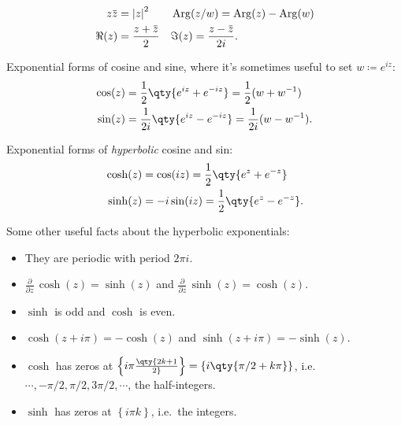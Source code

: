 \begin{fact}

\begin{align*}
z\mkern 1.5mu\overline{\mkern-1.5muz\mkern-1.5mu}\mkern 1.5mu &= {\left\lvert {z} \right\rvert}^2 && 
\operatorname{Arg}(z/w) = \operatorname{Arg}(z) - \operatorname{Arg}(w) \\
\Re(z) &= { z + \mkern 1.5mu\overline{\mkern-1.5muz\mkern-1.5mu}\mkern 1.5mu \over 2} && 
\Im(z) = {z - \mkern 1.5mu\overline{\mkern-1.5muz\mkern-1.5mu}\mkern 1.5mu \over 2i}
.\end{align*}

Exponential forms of cosine and sine, where it's sometimes useful to set
\(w\coloneqq e^{iz}\):
\begin{align*}
\cos(z) 
&= \frac 1 2 \qty{e^{iz} + e^{-iz}} = {1\over 2}(w+ w^{-1})\\
\sin(z) 
&= \frac{1}{2i}\qty{e^{iz} - e^{-iz}} = {1\over 2i}(w-w^{-1})
.\end{align*}

Exponential forms of \emph{hyperbolic} cosine and sin:
\begin{align*}
\cosh(z) 
&= \cos(iz) 
= {1\over 2}\qty{e^z + e^{-z}} \\
\sinh(z) 
&= -i \sin(iz) 
= {1\over 2}\qty{e^z - e^{-z}} 
.\end{align*}

Some other useful facts about the hyperbolic exponentials:

\begin{itemize}
\tightlist
\item
  They are periodic with period \(2\pi i\).
\item
  \({\frac{\partial }{\partial z}\,}\cosh(z) = \sinh(z)\) and
  \({\frac{\partial }{\partial z}\,}\sinh(z) = \cosh(z)\).
\item
  \(\sinh\) is odd and \(\cosh\) is even.
\item
  \(\cosh(z + i\pi) = -\cosh(z)\) and \(\sinh(z + i\pi) = -\sinh(z)\).
\item
  \(\cosh\) has zeros at
  \(\left\{{i\pi\qty{2k+1\over 2}}\right\} = \left\{{i \qty{\pi/2 + k\pi}}\right\}\),
  i.e.~\(\cdots, -\pi/2, \pi/2, 3\pi/2,\cdots\), the half-integers.
\item
  \(\sinh\) has zeros at \(\left\{{i\pi k}\right\}\), i.e.~the integers.
\end{itemize}

\end{fact}

